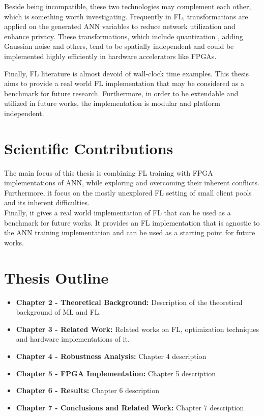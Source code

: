 Beside being incompatible, these two technologies may complement each other, which is something worth investigating. Frequently in FL, transformations are applied on the generated ANN variables to reduce network utilization and enhance privacy. These transformations, which include quantization \cite{Mills2020}, adding Gaussian noise \cite{Wei2020} and others, tend to be spatially independent and could be implemented highly efficiently in hardware accelerators like FPGAs.

Finally, FL literature is almost devoid of wall-clock time examples. This thesis aims to provide a real world FL implementation that may be considered as a benchmark for future research. Furthermore, in order to be extendable and utilized in future works, the implementation is modular and platform independent.


\section{Scientific Contributions}

The main focus of this thesis is combining FL training with FPGA implementations of ANN, while exploring and overcoming their inherent conflicts.\\
Furthermore, it focus on the mostly unexplored FL setting of small client pools and its inherent difficulties.\\
Finally, it gives a real world implementation of FL that can be used as a benchmark for future works. It provides an FL implementation that is agnostic to the ANN training implementation and can be used as a starting point for future works. 

\section{Thesis Outline}
\begin{itemize}
	\item \textbf{Chapter 2 - Theoretical Background:} Description of the theoretical background of ML and FL.
	\item \textbf{Chapter 3 - Related Work:} Related works on FL, optimization techniques and hardware implementations of it.
	\item \textbf{Chapter 4 - Robustness Analysis:} Chapter 4 description
	\item \textbf{Chapter 5 - FPGA Implementation:} Chapter 5 description
	\item \textbf{Chapter 6 - Results:} Chapter 6 description
	\item \textbf{Chapter 7 - Conclusions and Related Work:} Chapter 7 description
\end{itemize}
